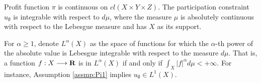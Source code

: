 
\begin{assumption}\label{assmp:Pi1}
	Profit function $\pi$ is continuous on $cl(X\times Y\times Z)$. The participation constraint $u_{\emptyset}$ is integrable with respect to $d \mu$, where the measure $\mu$ is absolutely continuous with respect to the Lebesgue measure and has $X$ as its support.
\end{assumption}





For $\alpha \ge 1$, denote $L^{\alpha}(X)$ as the space of functions for which the $\alpha$-th power of the absolute value is Lebesgue integrable {with respect to the measure $d \mu$}. That is, a function $f: X\longrightarrow {\mathbf R}$ is in $L^{\alpha}(X)$ if and only if $\int_{X} |f|^{\alpha} d\mu <+\infty$. For instance, Assumption \ref{assmp:Pi1} implies $u_{\emptyset}\in L^{1}(X)$.\medskip















